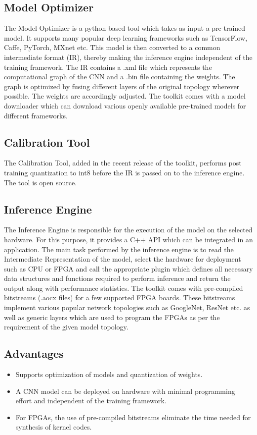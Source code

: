 \documentclass[titlepage]{report}
\begin{document}
\subsection{Model Optimizer}
The Model Optimizer is a python based tool which takes as input a pre-trained model. It supports many popular deep learning frameworks such as TensorFlow, Caffe, PyTorch, MXnet etc. This model is then converted to a common intermediate format (IR), thereby making the inference engine independent of the training framework. The IR contains a .xml file which represents the computational graph of the CNN and a .bin file containing the weights. The graph is optimized by fusing different layers of the original topology wherever possible. The weights are accordingly adjusted. The toolkit comes with a model downloader which can download various openly available pre-trained models for different frameworks.
 
\subsection{Calibration Tool}
 The Calibration Tool, added in the recent release of the toolkit, performs post training quantization to int8 before the IR is passed on to the inference engine.  The tool is open source. 
 
 \subsection{Inference Engine}
 The Inference Engine is responsible for the execution of the model on the selected hardware. For this purpose, it provides a C++ API which can be integrated in an application. The main task performed by the inference engine is to read the Intermediate Representation of the model, select the hardware for deployment such as CPU or FPGA and call the appropriate plugin which defines all necessary data structures and functions required to perform inference and return the output along with performance statistics. 
 The toolkit comes with pre-compiled bitstreams (.aocx files) for a few supported FPGA boards. These bitstreams implement various popular network topologies such as GoogleNet, ResNet etc. as well as generic layers which are used to program the FPGAs as per the requirement of the given model topology. 
 \subsection{Advantages}
  
 \begin{itemize}
 \item Supports optimization of models and quantization of weights.
 \item A CNN model can be deployed on hardware with minimal programming effort and independent of the training framework.
 \item For FPGAs, the use of pre-compiled bitstreams eliminate the time needed for synthesis of kernel codes.
 \end{itemize}
 
\end{document}

